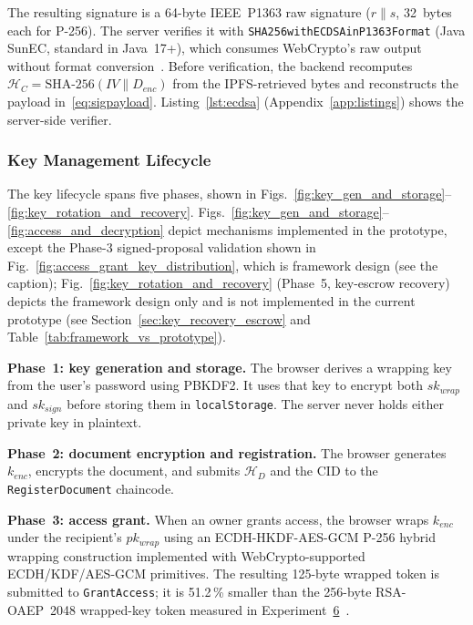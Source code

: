\documentclass[preprint,12pt]{elsarticle}
\begin{document}
The resulting signature is a 64-byte IEEE~P1363 raw signature ($r \| s$,
32~bytes each for P-256). The server verifies it with
\texttt{SHA256with}\allowbreak\texttt{ECDSAin}\allowbreak\texttt{P1363Format}
(Java SunEC, standard in Java~17+), which consumes WebCrypto's raw output
without format conversion~\cite{fips1865}. Before verification, the
backend recomputes $\mathcal{H}_C = \text{SHA-256}(IV \| D_{enc})$ from
the IPFS-retrieved bytes and reconstructs the payload in~\eqref{eq:sigpayload}.
Listing~\ref{lst:ecdsa} (Appendix~\ref{app:listings}) shows the server-side verifier.



\subsubsection{Key Management Lifecycle}
\label{sec:keymgmt}
The key lifecycle spans five phases, shown in
Figs.~\ref{fig:key_gen_and_storage}--\ref{fig:key_rotation_and_recovery}.
Figs.~\ref{fig:key_gen_and_storage}--\ref{fig:access_and_decryption}
depict mechanisms implemented in the prototype, except the Phase-3
signed-proposal validation shown in
Fig.~\ref{fig:access_grant_key_distribution}, which is framework design
(see the caption); Fig.~\ref{fig:key_rotation_and_recovery}
(Phase~5, key-escrow recovery) depicts the framework design only and is not
implemented in the current prototype (see Section~\ref{sec:key_recovery_escrow}
and Table~\ref{tab:framework_vs_prototype}).

\textbf{Phase~1: key generation and storage.} The browser derives a
wrapping key from the user's password using PBKDF2. It uses that key to
encrypt both $sk_{wrap}$ and $sk_{sign}$ before storing them in
\texttt{localStorage}. The server never holds either private key in
plaintext.

\textbf{Phase~2: document encryption and registration.} The browser
generates $k_{enc}$, encrypts the document, and submits $\mathcal{H}_D$
and the CID to the \texttt{RegisterDocument} chaincode.

\textbf{Phase~3: access grant.} When an owner grants access, the browser
wraps $k_{enc}$ under the recipient's $pk_{wrap}$ using an ECDH-HKDF-AES-GCM
P-256 hybrid wrapping construction implemented with WebCrypto-supported
ECDH/KDF/AES-GCM primitives. The resulting 125-byte wrapped token is
submitted to \texttt{GrantAccess}; it is 51.2\,\% smaller than the
256-byte RSA-OAEP~2048 wrapped-key token measured in Experiment~\hyperref[sec:exp_crypto]{6}~\cite{rfc8017}.
\end{document}
